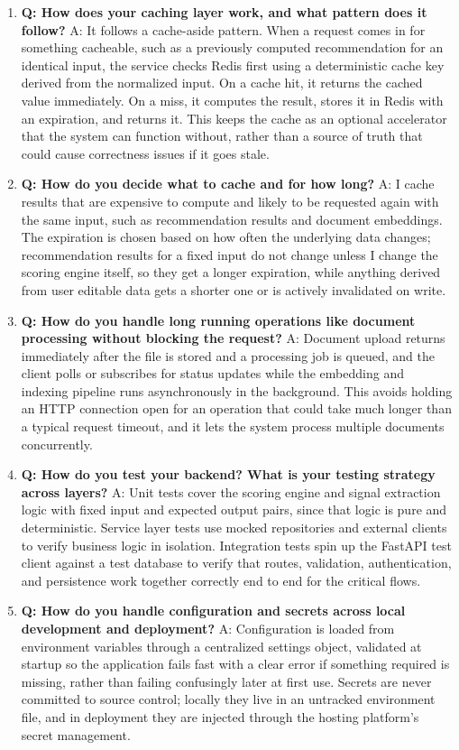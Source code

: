 \documentclass[11pt,a4paper]{report}
\begin{document}
\begin{enumerate}[leftmargin=*]
\item \textbf{Q: How does your caching layer work, and what pattern does it follow?}
A: It follows a cache-aside pattern. When a request comes in for something cacheable, such as a previously computed recommendation for an identical input, the service checks Redis first using a deterministic cache key derived from the normalized input. On a cache hit, it returns the cached value immediately. On a miss, it computes the result, stores it in Redis with an expiration, and returns it. This keeps the cache as an optional accelerator that the system can function without, rather than a source of truth that could cause correctness issues if it goes stale.

\item \textbf{Q: How do you decide what to cache and for how long?}
A: I cache results that are expensive to compute and likely to be requested again with the same input, such as recommendation results and document embeddings. The expiration is chosen based on how often the underlying data changes; recommendation results for a fixed input do not change unless I change the scoring engine itself, so they get a longer expiration, while anything derived from user editable data gets a shorter one or is actively invalidated on write.

\item \textbf{Q: How do you handle long running operations like document processing without blocking the request?}
A: Document upload returns immediately after the file is stored and a processing job is queued, and the client polls or subscribes for status updates while the embedding and indexing pipeline runs asynchronously in the background. This avoids holding an HTTP connection open for an operation that could take much longer than a typical request timeout, and it lets the system process multiple documents concurrently.

\item \textbf{Q: How do you test your backend? What is your testing strategy across layers?}
A: Unit tests cover the scoring engine and signal extraction logic with fixed input and expected output pairs, since that logic is pure and deterministic. Service layer tests use mocked repositories and external clients to verify business logic in isolation. Integration tests spin up the FastAPI test client against a test database to verify that routes, validation, authentication, and persistence work together correctly end to end for the critical flows.

\item \textbf{Q: How do you handle configuration and secrets across local development and deployment?}
A: Configuration is loaded from environment variables through a centralized settings object, validated at startup so the application fails fast with a clear error if something required is missing, rather than failing confusingly later at first use. Secrets are never committed to source control; locally they live in an untracked environment file, and in deployment they are injected through the hosting platform's secret management.


\end{enumerate}
\end{document}
